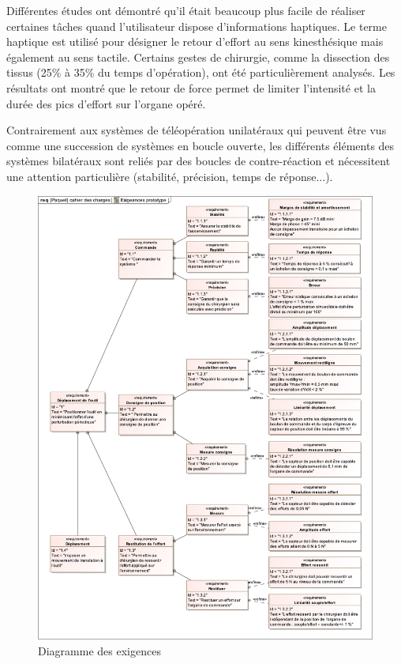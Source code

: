Différentes études ont démontré qu'il était beaucoup plus facile de réaliser certaines tâches quand l'utilisateur dispose d'informations haptiques. Le terme haptique est utilisé pour désigner le retour d'effort au sens kinesthésique mais également au sens tactile. Certains gestes de chirurgie, comme la dissection des tissus (25\% à 35\% du temps d'opération), ont été particulièrement analysés. Les résultats ont montré que le retour de force permet de limiter l'intensité et la durée des pics d'effort sur l'organe opéré.

Contrairement aux systèmes de téléopération unilatéraux qui peuvent être vus comme une succession de systèmes en boucle ouverte, les différents éléments des systèmes bilatéraux sont reliés par des boucles de contre-réaction et nécessitent une attention particulière (stabilité, précision, temps de réponse...).

\begin{figure}[ht!]
\begin{center}
 \includegraphics[width=0.98\linewidth]{img/Figure2}
\end{center}
\caption{Diagramme des exigences}
\label{fig2}
\end{figure}

